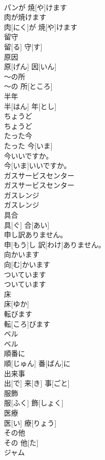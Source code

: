 \documentclass[8pt]{extreport}
\begin{document}
\begin{CJK}{UTF8}{min}
\\	パンが 焼[や]けます		
\\	肉が焼けます	
\\	肉[にく]が 焼[や]けます		
\\	留守	
\\	留[る] 守[す]		
\\	原因	
\\	原[げん] 因[いん]		
\\	～の所	
\\	～の 所[ところ]		
\\	半年	
\\	半[はん] 年[とし]		
\\	ちょうど	
\\	ちょうど		
\\	たった今	
\\	たった 今[いま]		
\\	今いいですか。	
\\	今[いま]いいですか。		
\\	ガスサービスセンター	
\\	ガスサービスセンター		
\\	ガスレンジ	
\\	ガスレンジ		
\\	具合	
\\	具[ぐ] 合[あい]		
\\	申し訳ありません。	
\\	申[もう]し 訳[わけ]ありません。		
\\	向かいます	
\\	向[む]かいます		
\\	ついています	
\\	ついています		
\\	床	
\\	床[ゆか]		
\\	転びます	
\\	転[ころ]びます		
\\	ベル	
\\	ベル		
\\	順番に	
\\	順[じゅん] 番[ばん]に		
\\	出来事	
\\	出[で] 来[き] 事[ごと]		
\\	服飾	
\\	服[ふく] 飾[しょく]		
\\	医療	
\\	医[い] 療[りょう]		
\\	その他	
\\	その 他[た]		
\\	ジャム	

\end{CJK}
\end{document}
